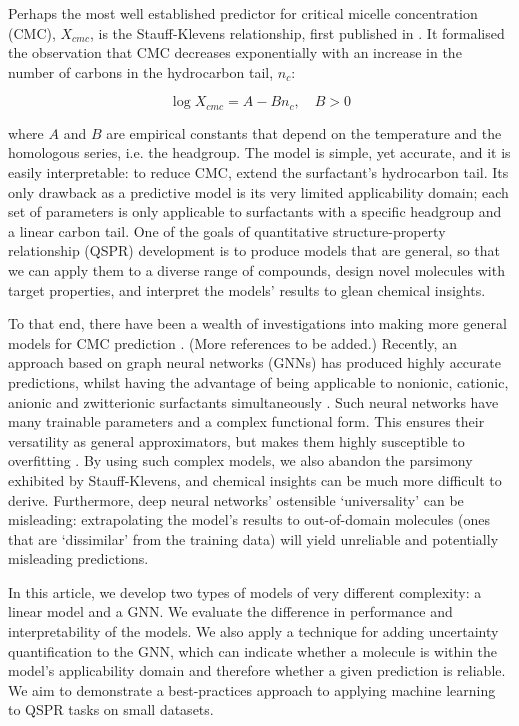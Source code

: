 Perhaps the most well established predictor for critical micelle concentration
(CMC), $X_{cmc}$, is the Stauff-Klevens relationship, first published in
\citeyear{klevensStructureAggregationDilate1953}
\cite{klevensStructureAggregationDilate1953}. It formalised the observation that
CMC decreases exponentially with an increase in the number of carbons in the
hydrocarbon tail, $n_c$:

\begin{equation}
    \label{eq:klevens}
    \log X_{cmc} = A - Bn_c, \quad B > 0
\end{equation}

where $A$ and $B$ are empirical constants that depend on the temperature and the
homologous series, i.e. the headgroup. The model is simple, yet accurate, and it
is easily interpretable: to reduce CMC, extend the surfactant's hydrocarbon
tail. Its only drawback as a predictive model is its very limited applicability
domain; each set of parameters is only applicable to surfactants with a specific
headgroup and a linear carbon tail. One of the goals of quantitative
structure-property relationship (QSPR) development is to produce models that are
general, so that we can apply them to a diverse range of compounds, design novel
molecules with target properties, and interpret the models' results to glean
chemical insights.

To that end, there have been a wealth of investigations into making more general
models for CMC prediction
\cite{gaudinNewQSPRModels2016,jakobtorweihenPredictingCriticalMicelle2017,matteiModelingCriticalMicelle2013}.
(More references to be added.) Recently, an approach based on graph neural
networks (GNNs) has produced highly accurate predictions, whilst having the
advantage of being applicable to nonionic, cationic, anionic and zwitterionic
surfactants simultaneously \cite{qinPredictingCriticalMicelle2021}. Such neural
networks have many trainable parameters and a complex functional form. This
ensures their versatility as general approximators, but makes them highly
susceptible to overfitting \cite{bejaniSystematicReviewOverfitting2021}. By
using such complex models, we also abandon the parsimony exhibited by
Stauff-Klevens, and chemical insights can be much more difficult to derive.
Furthermore, deep neural networks' ostensible `universality' can be misleading:
extrapolating the model's results to out-of-domain molecules (ones that are
`dissimilar' from the training data) will yield unreliable and potentially
misleading predictions.

In this article, we develop two types of models of very different complexity: a
linear model and a GNN. We evaluate the difference in performance and
interpretability of the models. We also apply a technique for adding uncertainty
quantification to the GNN, which can indicate whether a molecule is within the
model's applicability domain and therefore whether a given prediction is
reliable. We aim to demonstrate a best-practices approach to applying machine
learning to QSPR tasks on small datasets.
